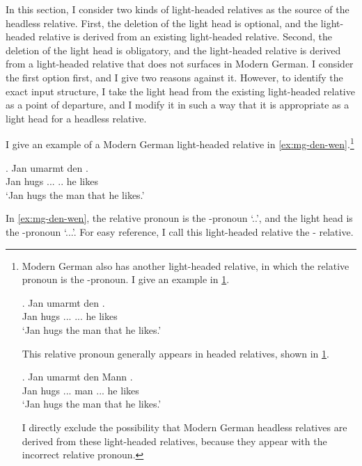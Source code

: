 In this section, I consider two kinds of light-headed relatives as the source of the headless relative.
First, the deletion of the light head is optional, and the light-headed relative is derived from an existing light-headed relative.
Second, the deletion of the light head is obligatory, and the light-headed relative is derived from a light-headed relative that does not surfaces in Modern German.
I consider the first option first, and I give two reasons against it.
However, to identify the exact input structure, I take the light head from the existing light-headed relative as a point of departure, and I modify it in such a way that it is appropriate as a light head for a headless relative.

I give an example of a Modern German light-headed relative in \ref{ex:mg-den-wen}.\footnote{
Modern German also has another light-headed relative, in which the relative pronoun is the -pronoun. I give an example in \ref{ex:mg-den-den}.

\exg. Jan umarmt den   .\\
Jan hugs ... ... he likes\\
`Jan hugs the man that he likes.'\label{ex:mg-den-den}

This relative pronoun generally appears in headed relatives, shown in \ref{ex:mg-den-headed}.

\exg. Jan umarmt den Mann   .\\
Jan hugs ... man ... he likes\\
`Jan hugs the man that he likes.'\label{ex:mg-den-headed}

I directly exclude the possibility that Modern German headless relatives are derived from these light-headed relatives, because they appear with the incorrect relative pronoun.
}

\exg. Jan umarmt den   .\\
Jan hugs ... .. he likes\\
`Jan hugs the man that he likes.'\label{ex:mg-den-wen}

In \ref{ex:mg-den-wen}, the relative pronoun is the -pronoun  `..', and the light head is the -pronoun  `...'. For easy reference, I call this light-headed relative the - relative.

